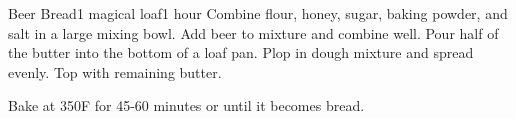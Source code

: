 \begin{recipe}{Beer Bread}{1 magical loaf}{1 hour}
  Combine flour, honey, sugar, baking powder, and salt in a large mixing bowl.
  Add beer to mixture and combine well.
  Pour half of the butter into the bottom of a loaf pan. Plop in dough mixture
  and spread evenly. Top with remaining butter.

  Bake at 350\0F for 45-60 minutes or until it becomes bread.
\end{recipe}
